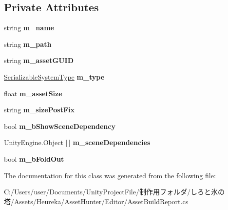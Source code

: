 \subsection*{Private Attributes}
\begin{DoxyCompactItemize}
\item 
\mbox{\label{class_heureka_games_1_1_build_report_asset_ac479594e7722a0cc7215b8f45244d5d7}} 
string {\bfseries m\+\_\+name}
\item 
\mbox{\label{class_heureka_games_1_1_build_report_asset_a6bda818c82a9ecd77b1582aeec76706a}} 
string {\bfseries m\+\_\+path}
\item 
\mbox{\label{class_heureka_games_1_1_build_report_asset_a23a89f13341164c84353cde4e9ed2983}} 
string {\bfseries m\+\_\+asset\+G\+U\+ID}
\item 
\mbox{\label{class_heureka_games_1_1_build_report_asset_a4acb408f53aefc40b441db971719cb7c}} 
\hyperlink{class_heureka_games_1_1_serializable_system_type}{Serializable\+System\+Type} {\bfseries m\+\_\+type}
\item 
\mbox{\label{class_heureka_games_1_1_build_report_asset_a0b7023e77ae822d1f4e0833c45358abd}} 
float {\bfseries m\+\_\+asset\+Size}
\item 
\mbox{\label{class_heureka_games_1_1_build_report_asset_a8dccd074c104ec4a2396041a636d6604}} 
string {\bfseries m\+\_\+size\+Post\+Fix}
\item 
\mbox{\label{class_heureka_games_1_1_build_report_asset_aa578171bc8f7e224568f8b9c86e8c8a6}} 
bool {\bfseries m\+\_\+b\+Show\+Scene\+Dependency}
\item 
\mbox{\label{class_heureka_games_1_1_build_report_asset_a5c08b9ac6a8d77fcc136a1aaa096c673}} 
Unity\+Engine.\+Object \mbox{[}$\,$\mbox{]} {\bfseries m\+\_\+scene\+Dependencies}
\item 
\mbox{\label{class_heureka_games_1_1_build_report_asset_ade62e11ca03171b876c55b3e8e6b92dd}} 
bool {\bfseries m\+\_\+b\+Fold\+Out}
\end{DoxyCompactItemize}


The documentation for this class was generated from the following file\+:\begin{DoxyCompactItemize}
\item 
C\+:/\+Users/user/\+Documents/\+Unity\+Project\+File/制作用フォルダ/しろと氷の塔/\+Assets/\+Heureka/\+Asset\+Hunter/\+Editor/Asset\+Build\+Report.\+cs\end{DoxyCompactItemize}
